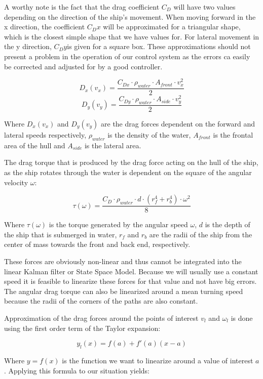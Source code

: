 A worthy note is the fact that the drag coefficient $ C_{D} $ will have two values depending on the direction of the ship's movement. When moving forward in the x direction, the coefficient $ C_{D}x $ will be approximated for a triangular shape, which is the closest simple shape that we have values for. For lateral movement in the y direction, $ C_{D}y $is given for a square box. These approximations should not present a problem in the operation of our control system as the errors ca easily be corrected and adjusted for by a good controller.

\[ D_{x}(v_{x}) = \frac{C_{Dx}\cdot\rho_{water}\cdot A_{front}\cdot v_{x}^{2}}{2} \]
\[ D_{y}(v_{y}) = \frac{C_{Dy}\cdot\rho_{water}\cdot A_{side}\cdot  v_{y}^{2}}{2} \]

Where $ D_{x}(v_{x}) $ and $ D_{y}(v_{y})$ are the drag forces dependent on the forward and lateral speeds respectively, $ \rho_{water} $ is the density of the water, $ A_{front} $ is the frontal area of the hull and $ A_{side} $ is the lateral area. 

The drag torque that is produced by the drag force acting on the hull of the ship, as the ship rotates through the water is dependent on the square of the angular velocity $ \omega $:

\[ \tau(\omega) = \frac{C_{D} \cdot \rho_{water} \cdot d \cdot (r_{f}^{4} + r_{b}^{4}) \cdot \omega^{2}}{8} \]

Where $ \tau(\omega) $ is the torque generated by the angular speed $ \omega $, $ d  $ is the depth of the ship that is submerged in water, $ r_{f} $ and $ r_{b} $ are the radii of the ship from the center of mass towards the front and back end, respectively.

These forces are obviously non-linear and thus cannot be integrated into the linear Kalman filter or State Space Model. Because we will usually use a constant speed it is feasible to linearize these forces for that value and not have big errors. The angular drag torque can also be linearized around a mean turning speed because the radii of the corners of the paths are also constant.

Approximation of the drag forces around the points of interest $v_{l} $ and $\omega_{l}$ is done using the first order term of the Taylor expansion:

\[ y_{l}(x) = f(a) + f'(a)(x-a) \]

Where $y = f(x)$ is the function we want to linearize around a value of interest $a$. Applying this formula to our situation yields:

